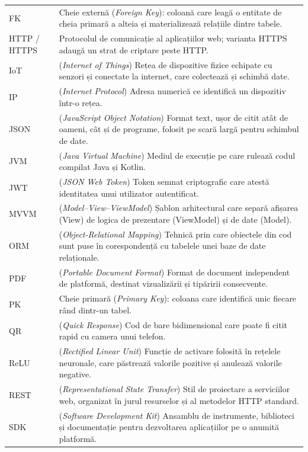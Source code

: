\begin{longtable}{@{}p{2.6cm} p{10.6cm}@{}}
FK & Cheie externă (\textit{Foreign Key}): coloană care leagă o entitate de cheia primară a alteia și materializează relațiile dintre tabele. \\
HTTP / HTTPS & Protocolul de comunicație al aplicațiilor web; varianta HTTPS adaugă un strat de criptare peste HTTP. \\
IoT & (\textit{Internet of Things}) Rețea de dispozitive fizice echipate cu senzori și conectate la internet, care colectează și schimbă date. \\
IP & (\textit{Internet Protocol}) Adresa numerică ce identifică un dispozitiv într-o rețea. \\
JSON & (\textit{JavaScript Object Notation}) Format text, ușor de citit atât de oameni, cât și de programe, folosit pe scară largă pentru schimbul de date. \\
JVM & (\textit{Java Virtual Machine}) Mediul de execuție pe care rulează codul compilat Java și Kotlin. \\
JWT & (\textit{JSON Web Token}) Token semnat criptografic care atestă identitatea unui utilizator autentificat. \\
MVVM & (\textit{Model–View–ViewModel}) Șablon arhitectural care separă afișarea (View) de logica de prezentare (ViewModel) și de date (Model). \\
ORM & (\textit{Object-Relational Mapping}) Tehnică prin care obiectele din cod sunt puse în corespondență cu tabelele unei baze de date relaționale. \\
PDF & (\textit{Portable Document Format}) Format de document independent de platformă, destinat vizualizării și tipăririi consecvente. \\
PK & Cheie primară (\textit{Primary Key}): coloana care identifică unic fiecare rând dintr-un tabel. \\
QR & (\textit{Quick Response}) Cod de bare bidimensional care poate fi citit rapid cu camera unui telefon. \\
ReLU & (\textit{Rectified Linear Unit}) Funcție de activare folosită în rețelele neuronale, care păstrează valorile pozitive și anulează valorile negative. \\
REST & (\textit{Representational State Transfer}) Stil de proiectare a serviciilor web, organizat în jurul resurselor și al metodelor HTTP standard. \\
SDK & (\textit{Software Development Kit}) Ansamblu de instrumente, biblioteci și documentație pentru dezvoltarea aplicațiilor pe o anumită platformă. \\

\end{longtable}
